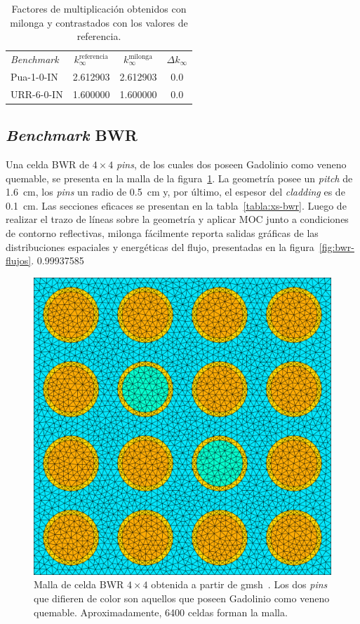 \documentclass[11pt]{article}
\numberwithin{equation}{section}
\begin{document}
{
\begin{table}[h!]
\begin{center}
\begin{tabular}{lccc}
\small \emph{Benchmark}  & \small $k_{\infty}^{\text{referencia}}$  & \small $k_{\infty}^{\text{milonga}}$  & \small $\Delta  k_{\infty}$ \\
\small Pua-1-0-IN        & \tiny \num{2.612903}                     & \tiny \num{2.612903}                  & \tiny \num{0.0}     \\
\small URR-6-0-IN        & \tiny \num{1.600000}                     & \tiny \num{1.600000}                  & \tiny \num{0.0} 
\end{tabular}
\caption{\label{tabla:k-infty} Factores de multiplicación obtenidos con milonga y contrastados con los valores de referencia.}
\end{center}
\end{table}
}


\subsection{\emph{Benchmark} BWR}

Una celda BWR de $\num{4} \times \num{4}$ \emph{pins}, de los cuales dos poseen Gadolinio como veneno quemable, se presenta en la malla de la figura~\ref{fig:bwr-mesh}. La geometr\'ia posee un \emph{pitch} de \SI{1.6}{\centi\metre}, los \emph{pins} un radio de \SI{0.5}{\centi\metre} y, por \'ultimo, el espesor del \emph{cladding} es de \SI{0.1}{\centi\metre}. Las secciones eficaces se presentan en la tabla~\ref{tabla:xs-bwr}. Luego de realizar el trazo de l\'ineas sobre la geometr\'ia y aplicar MOC junto a condiciones de contorno reflectivas, milonga f\'acilmente reporta salidas gr\'aficas de las distribuciones espaciales y energ\'eticas del flujo, presentadas en la figura~\ref{fig:bwr-flujos}. 0.99937585

\begin{figure}[!h]
 \begin{center}
  \includegraphics[width=0.6\linewidth]{graficos/bwr-gadolinio/bwr-gadolinio.pdf}
 \end{center}
\caption{\label{fig:bwr-mesh} Malla de celda BWR $\num{4} \times \num{4}$ obtenida a partir de gmsh~\cite{gmsh}. Los dos \emph{pins} que difieren de color son aquellos que poseen Gadolinio como veneno quemable. Aproximadamente, \num{6400} celdas forman la malla.}
\end{figure}
\end{document}
